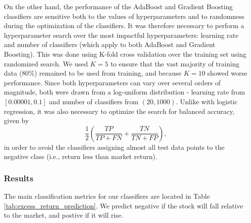 \documentclass{article}
\begin{document}
On the other hand, the performance of the AdaBoost and Gradient Boosting classifiers are sensitive both to the values of hyperparameters and to randomness during the optimization of the classifiers.
It was therefore necessary to perform a hyperparameter search over the most impactful hyperparameters: learning rate and number of classifiers (which apply to both AdaBoost and Gradient Boosting).
This was done using K-fold cross validation over the training set using randomized search.
We used $K=5$ to ensure that the vast majority of training data (80\%) remained to be used from training, and because $K=10$ showed worse performance.
Since both hyperparameters can vary over several orders of magnitude, both were drawn from a log-uniform distribution - learning rate from $[0.00001, 0.1]$ and number of classifiers from $(20, 1000)$.
Unlike with logistic regression, it was also necessary to optimize the search for balanced accuracy, given by \[\frac{1}{2}\left(\frac{TP}{TP+FN} + \frac{TN}{TN+FP}\right),\] in order to avoid the classifiers assigning almost all test data points to the negative class (i.e., return less than market return).

\subsubsection{Results}

The main classification metrics for our classifiers are located in Table \ref{tab:excess_return_prediction}.
We predict negative if the stock will fall relative to the market, and postive if it will rise.
\end{document}
